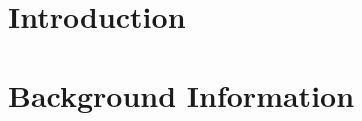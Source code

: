 \documentclass{newrucsthesis}
\begin{document}


\chapter{Introduction}
%

\chapter{Background Information}








\end{document}
